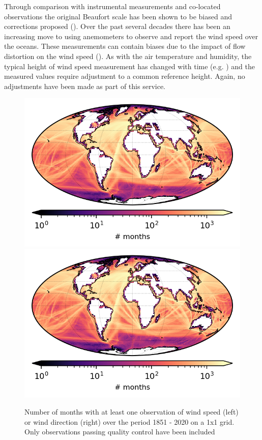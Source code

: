 Through comparison with instrumental measurements and co-located observations the original Beaufort scale has been shown to be biased and corrections proposed (\cite{Kent1997}).
Over the past several decades there has been an increasing move to using anemometers to observe and report the wind speed over the oceans. 
These measurements can contain biases due to the impact of flow distortion on the wind speed (\cite{Moat2005}).
As with the air temperature and humidity, the typical height of wind speed measurement has changed with time (e.g. \cite{Thomas2008}) and the measured values require adjustment to a common reference height.
Again, no adjustments have been made as part of this service.

\begin{figure}[h]
    \centering
    \includegraphics{resources/observations-ws-months-map-optimal.png}
    \includegraphics{resources/observations-wd-months-map-optimal.png}
    \caption{Number of months with at least one observation of wind speed (left) or wind direction (right) over the period 1851 - 2020 on a 1x1 grid. Only observations passing quality control have been included}
    \label{fig:wspd-nmonths-map}
\end{figure}

